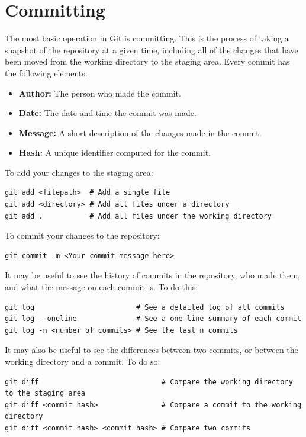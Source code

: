 \documentclass[fleqn]{article}
\begin{document}
\pagebreak

\section*{Committing}
The most basic operation in Git is committing. This is the process of taking a
snapshot of the repository at a given time, including all of the changes that 
have been moved from the working directory to the staging area. Every commit
has the following elements:

\begin{itemize}
    \item \textbf{Author:} The person who made the commit.
    \item \textbf{Date:} The date and time the commit was made.
    \item \textbf{Message:} A short description of the changes made in the
                            commit.
    \item \textbf{Hash:} A unique identifier computed for the commit.
\end{itemize}

To add your changes to the staging area:
\begin{lstlisting}
git add <filepath>  # Add a single file
git add <directory> # Add all files under a directory
git add .           # Add all files under the working directory
\end{lstlisting}

To commit your changes to the repository:
\begin{lstlisting}
git commit -m <Your commit message here>
\end{lstlisting}

It may be useful to see the history of commits in the repository, who made them,
and what the message on each commit is. To do this:

\begin{lstlisting}
git log                        # See a detailed log of all commits
git log --oneline              # See a one-line summary of each commit
git log -n <number of commits> # See the last n commits
\end{lstlisting}

It may also be useful to see the differences between two commits, or between
the working directory and a commit. To do so:

\begin{lstlisting}
git diff                             # Compare the working directory to the staging area
git diff <commit hash>               # Compare a commit to the working directory
git diff <commit hash> <commit hash> # Compare two commits
\end{lstlisting}
\end{document}
